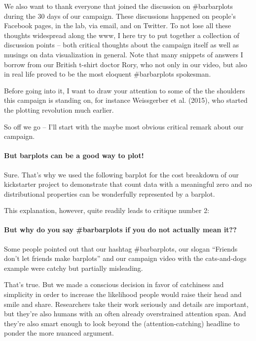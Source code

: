 \documentclass[english,floatsintext,man]{apa6}
\begin{document}
We also want to thank everyone that joined the discussion on
\#barbarplots during the 30 days of our campaign. These discussions
happened on people's Facebook pages, in the lab, via email, and on
Twitter. To not lose all these thoughts widespread along the www, I here
try to put together a collection of discussion points -- both critical
thoughts about the campaign itself as well as musings on data
visualization in general. Note that many snippets of answers I borrow
from our British t-shirt doctor Rory, who not only in our video, but
also in real life proved to be the most eloquent \#barbarplots
spokesman.

Before going into it, I want to draw your attention to some of the the
shoulders this campaign is standing on, for instance Weissgerber et al.
(2015), who started the plotting revolution much earlier.

So off we go -- I'll start with the maybe most obvious critical remark
about our campaign.

\paragraph{But barplots can be a good way to
plot!}\label{but-barplots-can-be-a-good-way-to-plot}

Sure. That's why we used the following barplot for the cost breakdown of
our kickstarter project to demonstrate that count data with a meaningful
zero and no distributional properties can be wonderfully represented by
a barplot.

This explanation, however, quite readily leads to critique number 2:

\paragraph{But why do you say \#barbarplots if you do not actually mean
it??}\label{but-why-do-you-say-barbarplots-if-you-do-not-actually-mean-it}

Some people pointed out that our hashtag \#barbarplots, our slogan
\enquote{Friends don't let friends make barplots} and our campaign video
with the cats-and-dogs example were catchy but partially misleading.

That's true. But we made a conscious decision in favor of catchiness and
simplicity in order to increase the likelihood people would raise their
head and smile and share. Researchers take their work seriously and
details are important, but they're also humans with an often already
overstrained attention span. And they're also smart enough to look
beyond the (attention-catching) headline to ponder the more nuanced
argument.
\end{document}
